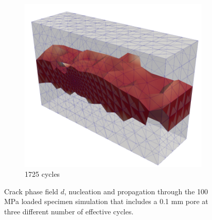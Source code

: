 \documentclass[11pt,a4paper]{article}
\begin{document}
\begin{figure} [ht]
\begin{subfigure}{0.27\textwidth}
\includegraphics[scale=0.26, center]{12.35.png}
\caption{1725 cycles}
\end{subfigure}
\caption{Crack phase field $d$, nucleation and propagation through the 100 MPa loaded specimen simulation that includes a 0.1 mm pore at three different number of effective cycles.}
\label{damage field}
\end{figure}
\end{document}
